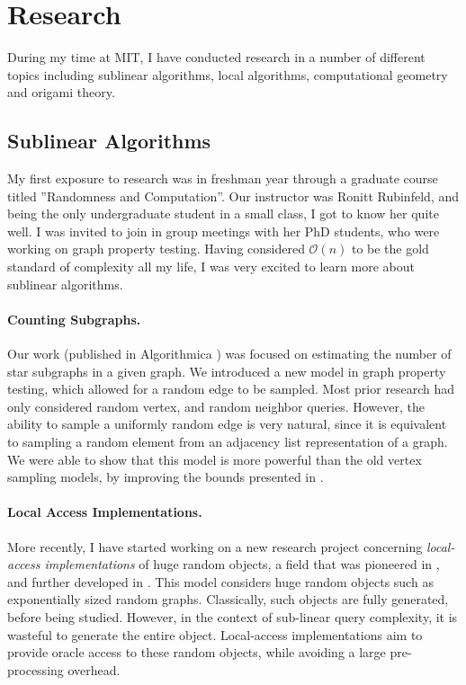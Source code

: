 \section{Research}
\label{sec:research}

During my time at MIT, I have conducted research in a number of different topics%
including sublinear algorithms, local algorithms, computational geometry and origami theory.

\subsection*{Sublinear Algorithms}
My first exposure to research was in freshman year through a graduate course titled ''Randomness and Computation''.
Our instructor was Ronitt Rubinfeld, and being the only undergraduate student in a small class, I got to know her quite well.
I was invited to join in group meetings with her PhD students, who were working on graph property testing.
Having considered $ \mathcal{O}(n) $ to be the gold standard of complexity all my life,
I was very excited to learn more about sublinear algorithms.

\paragraph{Counting Subgraphs.}
Our work (published in Algorithmica \cite{stars}) was focused on estimating the number of star subgraphs in a given graph.
We introduced a new model in graph property testing, which allowed for a random edge to be sampled.
Most prior research had only considered random vertex, and random neighbor queries.
However, the ability to sample a uniformly random edge is very natural,
since it is equivalent to sampling a random element from an adjacency list representation of a graph.
We were able to show that this model is more powerful than the old vertex sampling models,
by improving the bounds presented in \cite{old_stars}.

\paragraph{Local Access Implementations.}
More recently, I have started working on a new research project concerning \emph{local-access implementations} of huge random objects,
a field that was pioneered in \cite{huge, huge_old}, and further developed in \cite{sparse, reut}.
This model considers huge random objects such as exponentially sized random graphs.
Classically, such objects are fully generated, before being studied.
However, in the context of sub-linear query complexity, it is wasteful to generate the entire object.
Local-access implementations aim to provide oracle access to these random objects, while avoiding a large pre-processing overhead.

